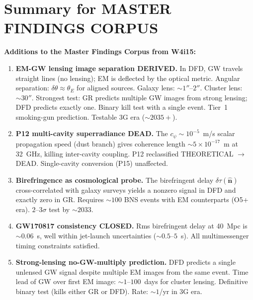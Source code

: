 \documentclass[11pt]{article}
\newcommand{\ee}[1]{\times 10^{#1}}
\begin{document}
\part*{Summary for MASTER FINDINGS CORPUS}

\noindent\textbf{Additions to the Master Findings Corpus from W4i15:}

\begin{enumerate}
\item \textbf{EM-GW lensing image separation DERIVED.} In DFD, GW
  travels straight lines (no lensing); EM is deflected by the optical
  metric. Angular separation: $\delta\theta \approx \theta_E$ for
  aligned sources. Galaxy lens: $\sim 1''$--$2''$. Cluster lens:
  $\sim 30''$. Strongest test: GR predicts multiple GW images from
  strong lensing; DFD predicts exactly one. Binary kill test with
  a single event. Tier~1 smoking-gun prediction. Testable 3G era
  ($\sim 2035+$).

\item \textbf{P12 multi-cavity superradiance DEAD.} The
  $c_\psi \sim 10^{-5}$~m/s scalar propagation speed (dust branch)
  gives coherence length $\sim 5\ee{-17}$~m at 32~GHz, killing
  inter-cavity coupling. P12 reclassified THEORETICAL $\to$ DEAD.
  Single-cavity conversion (P15) unaffected.

\item \textbf{Birefringence as cosmological probe.} The birefringent
  delay $\delta\tau(\hat{\mathbf{n}})$ cross-correlated with galaxy
  surveys yields a nonzero signal in DFD and exactly zero in GR.
  Requires $\sim 100$ BNS events with EM counterparts (O5+ era).
  $2$--$3\sigma$ test by $\sim 2033$.

\item \textbf{GW170817 consistency CLOSED.} Rms birefringent delay
  at 40~Mpc is $\sim 0.06$~s, well within jet-launch uncertainties
  ($\sim 0.5$--$5$~s). All multimessenger timing constraints satisfied.

\item \textbf{Strong-lensing no-GW-multiply prediction.} DFD predicts
  a single unlensed GW signal despite multiple EM images from the
  same event. Time lead of GW over first EM image: $\sim 1$--$100$~days
  for cluster lensing. Definitive binary test (kills either GR or DFD).
  Rate: $\sim 1$/yr in 3G era.
\end{enumerate}
\end{document}
